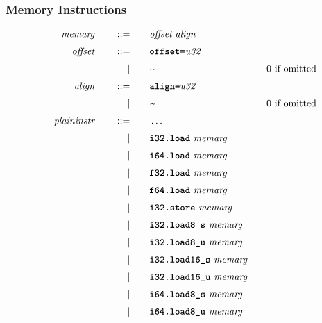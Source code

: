 \subsubsection{Memory Instructions}
\begin{alignat*}{9}
    && \textit{memarg}\ &&\quad ::= &\quad && \textit{offset}\ \textit{align} \quad &&  \\[1mm]
    && \textit{offset}\ &&\quad ::= &\quad && \textbf{\texttt{offset=}} \textit{u32} \quad &&  \\[1mm]
    &&       &&\quad | &\quad && \textit{\textasciitilde} \quad && \textrm{0 if omitted} \\[1mm]
    && \textit{align}\ &&\quad ::= &\quad && \textbf{\texttt{align=}} \textit{u32} \quad &&  \\[1mm]
    &&       &&\quad | &\quad && \textit{\textasciitilde} \quad && \textrm{0 if omitted} \\[1mm]
    && \textit{plaininstr}\ &&\quad ::= &\quad && \dots \quad &&  \\[1mm]
    &&       &&\quad | &\quad && \textbf{\texttt{i32.load}}\ \textit{memarg} \quad &&  \\[1mm]
    &&       &&\quad | &\quad && \textbf{\texttt{i64.load}}\ \textit{memarg} \quad &&  \\[1mm]
    &&       &&\quad | &\quad && \textbf{\texttt{f32.load}}\ \textit{memarg} \quad &&  \\[1mm]
    &&       &&\quad | &\quad && \textbf{\texttt{f64.load}}\ \textit{memarg} \quad &&  \\[1mm]
    &&       &&\quad | &\quad && \textbf{\texttt{i32.store}}\ \textit{memarg} \quad &&  \\[1mm]
    &&       &&\quad | &\quad && \textbf{\texttt{i32.load8\textunderscore s}}\ \textit{memarg} \quad &&  \\[1mm]
    &&       &&\quad | &\quad && \textbf{\texttt{i32.load8\textunderscore u}}\ \textit{memarg} \quad &&  \\[1mm]
    &&       &&\quad | &\quad && \textbf{\texttt{i32.load16\textunderscore s}}\ \textit{memarg} \quad &&  \\[1mm]
    &&       &&\quad | &\quad && \textbf{\texttt{i32.load16\textunderscore u}}\ \textit{memarg} \quad &&  \\[1mm]
    &&       &&\quad | &\quad && \textbf{\texttt{i64.load8\textunderscore s}}\ \textit{memarg} \quad &&  \\[1mm]
    &&       &&\quad | &\quad && \textbf{\texttt{i64.load8\textunderscore u}}\ \textit{memarg} \quad &&  \\[1mm]

\end{alignat*}
